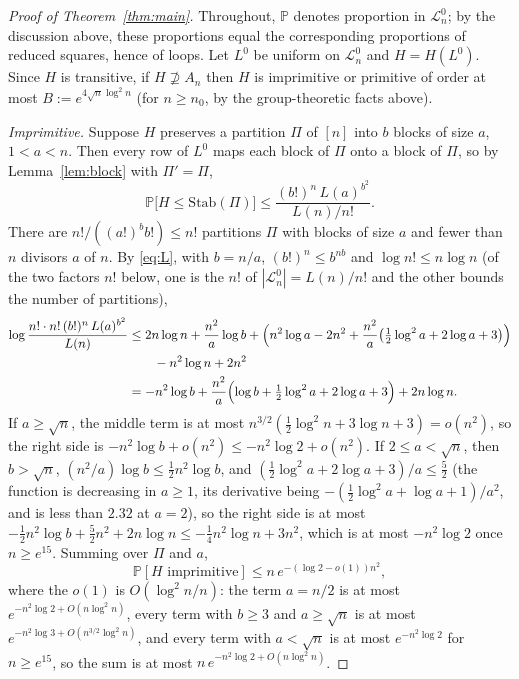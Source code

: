 \documentclass[11pt]{amsart}
\theoremstyle{plain}
\theoremstyle{remark}
\newcommand{\Stab}{\mathrm{Stab}}
\renewcommand{\Pr}{\mathbb{P}}
\newcommand{\LL}{\mathcal{L}}
\begin{document}
\begin{proof}[Proof of Theorem~\ref{thm:main}]
Throughout, $\Pr$ denotes proportion in $\LL_n^0$; by the discussion above,
these proportions equal the corresponding proportions of reduced squares, hence of loops.
Let $L^0$ be uniform on $\LL_n^0$ and $H=H(L^0)$. Since $H$ is
transitive, if $H\not\supseteq A_n$ then $H$ is imprimitive or
primitive of order at most $B:=e^{4\sqrt n\log^2n}$ (for $n\ge n_0$, by
the group-theoretic facts above).

\emph{Imprimitive.}  Suppose $H$ preserves a partition $\Pi$ of $[n]$
into $b$ blocks of size $a$, $1<a<n$.  Then every row of $L^0$ maps
each block of $\Pi$ onto a block of $\Pi$, so by Lemma~\ref{lem:block}
with $\Pi'=\Pi$,
\[
\Pr\bigl[H\le\Stab(\Pi)\bigr]\le\frac{(b!)^n\,L(a)^{b^2}}{L(n)/n!}.
\]
There are $n!/((a!)^bb!)\le n!$ partitions $\Pi$ with blocks of size $a$
and fewer than $n$ divisors $a$ of $n$.  By \eqref{eq:L}, with $b=n/a$,
$(b!)^n\le b^{nb}$ and $\log n!\le n\log n$ (of the two factors $n!$
below, one is the $n!$ of $|\LL_n^0|=L(n)/n!$ and the other bounds the
number of partitions),
\begin{align*}
\log\frac{n!\cdot n!\,(b!)^n\,L(a)^{b^2}}{L(n)}
&\le2n\log n+\frac{n^2}a\log b+\Bigl(n^2\log a-2n^2+\frac{n^2}a\bigl(\tfrac12\log^2a+2\log a+3\bigr)\Bigr)\\
&\qquad-n^2\log n+2n^2\\
&=-n^2\log b+\frac{n^2}a\Bigl(\log b+\tfrac12\log^2a+2\log a+3\Bigr)+2n\log n.
\end{align*}
If $a\ge\sqrt n$, the middle term is at most
$n^{3/2}(\frac12\log^2n+3\log n+3)=o(n^2)$, so the right side is
$-n^2\log b+o(n^2)\le-n^2\log2+o(n^2)$.  If $2\le a<\sqrt n$, then
$b>\sqrt n$, $(n^2/a)\log b\le\frac12n^2\log b$, and
$(\frac12\log^2a+2\log a+3)/a\le\frac52$ (the function is decreasing in
$a\ge1$, its derivative being $-(\frac12\log^2a+\log a+1)/a^2$, and is
less than $2.32$ at $a=2$), so the right side is at most
$-\frac12n^2\log b+\frac52n^2+2n\log n\le-\frac14n^2\log n+3n^2$, which
is at most $-n^2\log2$ once $n\ge e^{15}$.  Summing over $\Pi$ and $a$,
\[
\Pr[H\text{ imprimitive}]\le n\,e^{-(\log2-o(1))n^2},
\]
where the $o(1)$ is $O(\log^2n/n)$: the term $a=n/2$ is at most
$e^{-n^2\log2+O(n\log^2n)}$, every term with $b\ge3$ and
$a\ge\sqrt n$ is at most $e^{-n^2\log3+O(n^{3/2}\log^2n)}$, and every
term with $a<\sqrt n$ is at most $e^{-n^2\log2}$ for $n\ge e^{15}$, so
the sum is at most $n\,e^{-n^2\log2+O(n\log^2n)}$.


\end{proof}
\end{document}
